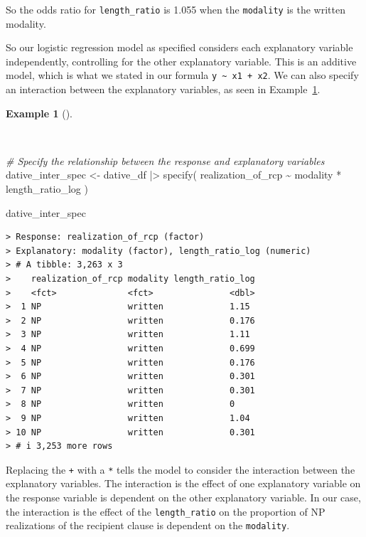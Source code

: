 \documentclass[
  letterpaper,
  DIV=11,
  numbers=noendperiod]{scrreprt}
\newenvironment{Shaded}{\begin{snugshade}}{\end{snugshade}}
\newcommand{\CommentTok}[1]{\textcolor[rgb]{0.00,0.00,0.00}{\textit{#1}}}
\newcommand{\FunctionTok}[1]{\textcolor[rgb]{0.00,0.00,0.00}{#1}}
\newcommand{\NormalTok}[1]{\textcolor[rgb]{0.00,0.00,0.00}{#1}}
\newcommand{\OtherTok}[1]{\textcolor[rgb]{0.00,0.00,0.00}{#1}}
\newcommand{\SpecialCharTok}[1]{\textcolor[rgb]{0.00,0.00,0.00}{#1}}
\theoremstyle{definition}
\newtheorem{example}{Example}[chapter]
\theoremstyle{remark}
\begin{document}
So the odds ratio for \texttt{length\_ratio} is 1.055 when the
\texttt{modality} is the written modality.

So our logistic regression model as specified considers each explanatory
variable independently, controlling for the other explanatory variable.
This is an additive model, which is what we stated in our formula
\texttt{y\ \textasciitilde{}\ x1\ +\ x2}. We can also specify an
interaction between the explanatory variables, as seen in
Example~\ref{exm-ida-cat-logistic-regression-interaction}.

\begin{example}[]\protect\hypertarget{exm-ida-cat-logistic-regression-interaction}{}\label{exm-ida-cat-logistic-regression-interaction}

~

\begin{Shaded}
\begin{Highlighting}[]
\CommentTok{\# Specify the relationship between the response and explanatory variables}
\NormalTok{dative\_inter\_spec }\OtherTok{\textless{}{-}}
\NormalTok{  dative\_df }\SpecialCharTok{|\textgreater{}}
  \FunctionTok{specify}\NormalTok{(}
\NormalTok{    realization\_of\_rcp }\SpecialCharTok{\textasciitilde{}}\NormalTok{ modality }\SpecialCharTok{*}\NormalTok{ length\_ratio\_log}
\NormalTok{  )}

\NormalTok{dative\_inter\_spec}
\end{Highlighting}
\end{Shaded}

\begin{verbatim}
> Response: realization_of_rcp (factor)
> Explanatory: modality (factor), length_ratio_log (numeric)
> # A tibble: 3,263 x 3
>    realization_of_rcp modality length_ratio_log
>    <fct>              <fct>               <dbl>
>  1 NP                 written             1.15 
>  2 NP                 written             0.176
>  3 NP                 written             1.11 
>  4 NP                 written             0.699
>  5 NP                 written             0.176
>  6 NP                 written             0.301
>  7 NP                 written             0.301
>  8 NP                 written             0    
>  9 NP                 written             1.04 
> 10 NP                 written             0.301
> # i 3,253 more rows
\end{verbatim}

\end{example}

Replacing the \texttt{+} with a \texttt{*} tells the model to consider
the interaction between the explanatory variables. The interaction is
the effect of one explanatory variable on the response variable is
dependent on the other explanatory variable. In our case, the
interaction is the effect of the \texttt{length\_ratio} on the
proportion of NP realizations of the recipient clause is dependent on
the \texttt{modality}.
\end{document}
